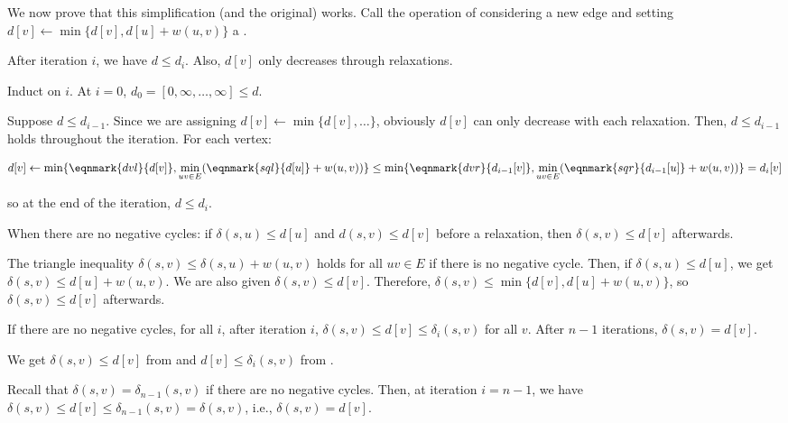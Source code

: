 We now prove that this simplification (and the original) works.
Call the operation of considering a new edge and setting
$d[v] \gets \min\{d[v],d[u] + w(u,v)\}$ a .
\begin{claim}\label{claim:dp:bf1}
  After iteration $i$, we have $d \leq d_i$.
  Also, $d[v]$ only decreases through relaxations.
\end{claim}
\begin{prf}
  Induct on $i$.
  At $i = 0$, $d_0 = [0,\infty,\dotsc,\infty] \leq d$.

  Suppose $d \leq d_{i-1}$.
  Since we are assigning $d[v] \gets \min\{d[v], \dotsc\}$,
  obviously $d[v]$ can only decrease with each relaxation.
  Then, $d \leq d_{i-1}$ holds throughout the iteration.
  For each vertex:

  \vspace*{1em}
  \begin{equation*}
    d[v] \gets \min\{\eqnmark{dvl}{d[v]}, \min_{uv \in E}(\eqnmark{sql}{d[u]} + w(u,v))\}
    \leq \min\{\eqnmark{dvr}{d_{i-1}[v]}, \min_{uv \in E}(\eqnmark{sqr}{d_{i-1}[u]} + w(u,v))\}
    = d_i[v]
  \end{equation*}
  \vspace*{1em}

  so at the end of the iteration, $d \leq d_i$.
\end{prf}

\begin{claim}\label{claim:dp:bf2}
  When there are no negative cycles:
  if $\delta(s,u) \leq d[u]$ and $d(s,v) \leq d[v]$ before a relaxation,
  then $\delta(s,v) \leq d[v]$ afterwards.
\end{claim}
\begin{prf}
  The triangle inequality $\delta(s,v) \leq \delta(s,u) + w(u,v)$
  holds for all $uv \in E$ if there is no negative cycle.
  Then, if $\delta(s,u) \leq d[u]$, we get $\delta(s,v) \leq d[u] + w(u,v)$.
  We are also given $\delta(s,v) \leq d[v]$.
  Therefore, $\delta(s,v) \leq \min\{d[v],d[u] + w(u,v)\}$,
  so $\delta(s,v) \leq d[v]$ afterwards.
\end{prf}

\begin{prop}
  If there are no negative cycles, for all $i$, after iteration $i$,
  $\delta(s,v) \leq d[v] \leq \delta_i(s,v)$ for all $v$.
  After $n-1$ iterations, $\delta(s,v) = d[v]$.
\end{prop}
\begin{prf}
  We get $\delta(s,v) \leq d[v]$ from 
  and $d[v] \leq \delta_i(s,v)$ from .

  Recall that $\delta(s,v) = \delta_{n-1}(s,v)$ if there are no negative cycles.
  Then, at iteration $i=n-1$,
  we have $\delta(s,v) \leq d[v] \leq \delta_{n-1}(s,v) = \delta(s,v)$,
  i.e., $\delta(s,v) = d[v]$.
\end{prf}

